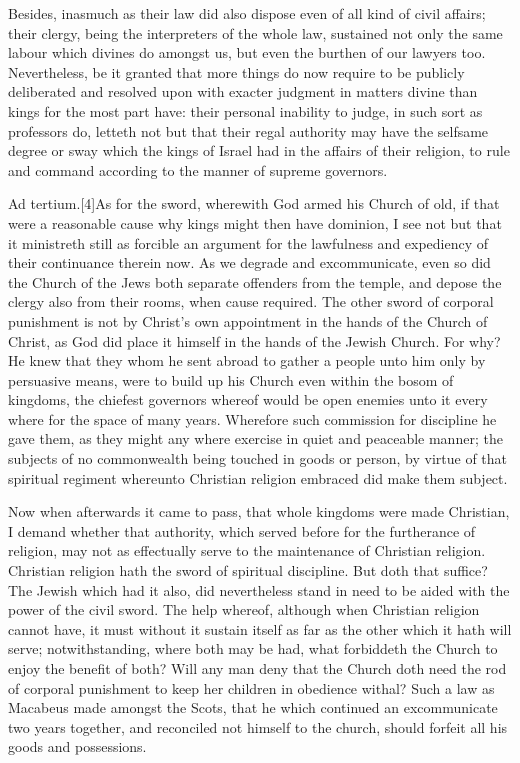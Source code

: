 Besides, inasmuch as their law did also dispose even of all kind of civil affairs; their clergy, being the interpreters of the whole law, sustained not only the same labour which divines do amongst us, but even the burthen of our lawyers too. Nevertheless, be it granted that more things do now require to be publicly deliberated and resolved upon with exacter judgment in matters divine than kings for the most part have: their personal inability to judge, in such sort as professors do, letteth not but that their regal authority may have the selfsame degree or sway which the kings of Israel had in the affairs of their religion, to rule and command according to the manner of supreme governors.

Ad tertium.[4]As for the sword, wherewith God armed his Church of old, if that were a reasonable cause why kings might then have dominion, I see not but that it ministreth still as forcible an argument for the lawfulness and expediency of their continuance therein now. As we degrade and excommunicate, even so did the Church of the Jews both separate offenders from the temple, and depose the clergy also from their rooms, when cause required. The other sword of corporal punishment is not by Christ’s own appointment in the hands of the Church of Christ, as God did place it himself in the hands of the Jewish Church. For why? He knew that they whom  he sent abroad to gather a people unto him only by persuasive means, were to build up his Church even within the bosom of kingdoms, the chiefest governors whereof would be open enemies unto it every where for the space of many years. Wherefore such commission for discipline he gave them, as they might any where exercise in quiet and peaceable manner; the subjects of no commonwealth being touched in goods or person, by virtue of that spiritual regiment whereunto Christian religion embraced did make them subject.

Now when afterwards it came to pass, that whole kingdoms were made Christian, I demand whether that authority, which served before for the furtherance of religion, may not as effectually serve to the maintenance of Christian religion. Christian religion hath the sword of spiritual discipline. But doth that suffice? The Jewish which had it also, did nevertheless stand in need to be aided with the power of the civil sword. The help whereof, although when Christian religion cannot have, it must without it sustain itself as far as the other which it hath will serve; notwithstanding, where both may be had, what forbiddeth the Church to enjoy the benefit of both? Will any man deny that the Church doth need the rod of corporal punishment to keep her children in obedience withal? Such a law as Macabeus made amongst the Scots, that he which continued an excommunicate two years together, and reconciled not himself to the church, should forfeit all his goods and possessions.

